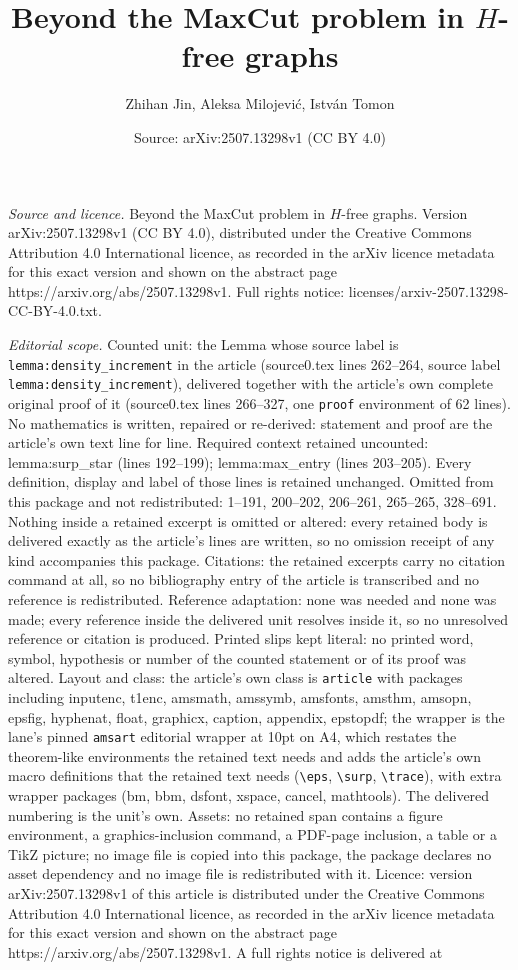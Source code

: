\documentclass[10pt,a4paper]{amsart}
\title[Beyond the MaxCut problem in $H$-free graphs]{Beyond the MaxCut problem in $H$-free graphs}
\author{Zhihan Jin, Aleksa Milojevi\'c, Istv\'an Tomon}
\date{Source: arXiv:2507.13298v1 (CC BY 4.0)}
\begin{document}
\maketitle

\noindent\emph{Source and licence.} Beyond the MaxCut problem in $H$-free graphs. Version arXiv:2507.13298v1 (CC BY 4.0), distributed under the Creative Commons Attribution 4.0 International licence, as recorded in the arXiv licence metadata for this exact version and shown on the abstract page https://arxiv.org/abs/2507.13298v1. Full rights notice: licenses/arxiv-2507.13298-CC-BY-4.0.txt.\par\smallskip

\noindent\textit{Editorial scope.} Counted unit: the Lemma whose source label is \texttt{lemma:density\_increment} in the article (source0.tex lines 262--264, source label \texttt{lemma:density\_increment}), delivered together with the article's own complete original proof of it (source0.tex lines 266--327, one \texttt{proof} environment of 62 lines). No mathematics is written, repaired or re-derived: statement and proof are the article's own text line for line. Required context retained uncounted: lemma:surp\_star (lines 192--199); lemma:max\_entry (lines 203--205). Every definition, display and label of those lines is retained unchanged. Omitted from this package and not redistributed: 1--191, 200--202, 206--261, 265--265, 328--691. Nothing inside a retained excerpt is omitted or altered: every retained body is delivered exactly as the article's lines are written, so no omission receipt of any kind accompanies this package. Citations: the retained excerpts carry no citation command at all, so no bibliography entry of the article is transcribed and no reference is redistributed. Reference adaptation: none was needed and none was made; every reference inside the delivered unit resolves inside it, so no unresolved reference or citation is produced. Printed slips kept literal: no printed word, symbol, hypothesis or number of the counted statement or of its proof was altered. Layout and class: the article's own class is \texttt{article} with packages including inputenc, t1enc, amsmath, amssymb, amsfonts, amsthm, amsopn, epsfig, hyphenat, float, graphicx, caption, appendix, epstopdf; the wrapper is the lane's pinned \texttt{amsart} editorial wrapper at 10pt on A4, which restates the theorem-like environments the retained text needs and adds the article's own macro definitions that the retained text needs (\texttt{\textbackslash eps}, \texttt{\textbackslash surp}, \texttt{\textbackslash trace}), with extra wrapper packages (bm, bbm, dsfont, xspace, cancel, mathtools). The delivered numbering is the unit's own. Assets: no retained span contains a figure environment, a graphics-inclusion command, a PDF-page inclusion, a table or a TikZ picture; no image file is copied into this package, the package declares no asset dependency and no image file is redistributed with it. Licence: version arXiv:2507.13298v1 of this article is distributed under the Creative Commons Attribution 4.0 International licence, as recorded in the arXiv licence metadata for this exact version and shown on the abstract page https://arxiv.org/abs/2507.13298v1. A full rights notice is delivered at 
\end{document}
